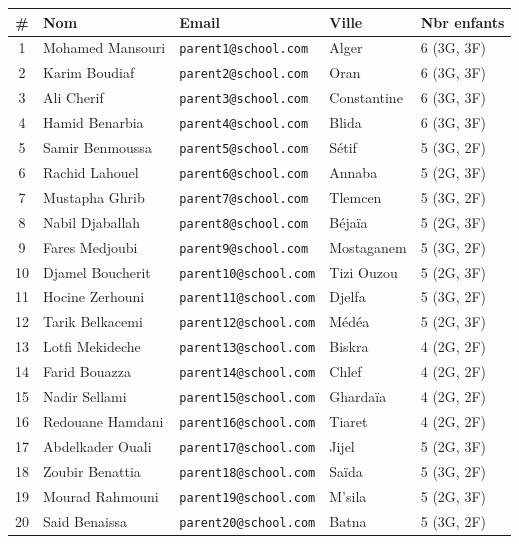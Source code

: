 \documentclass[a4paper,11pt]{article}
\begin{document}
\begin{longtable}{c l l l l}
    \toprule
    \textbf{\#} & \textbf{Nom}             & \textbf{Email}                   & \textbf{Ville}    & \textbf{Nbr enfants} \\
    \midrule
    \endhead
    1  & Mohamed Mansouri   & \texttt{parent1@school.com}  & Alger       & 6 (3G, 3F) \\
    2  & Karim Boudiaf      & \texttt{parent2@school.com}  & Oran        & 6 (3G, 3F) \\
    3  & Ali Cherif         & \texttt{parent3@school.com}  & Constantine & 6 (3G, 3F) \\
    4  & Hamid Benarbia     & \texttt{parent4@school.com}  & Blida       & 6 (3G, 3F) \\
    5  & Samir Benmoussa    & \texttt{parent5@school.com}  & Sétif       & 5 (3G, 2F) \\
    6  & Rachid Lahouel     & \texttt{parent6@school.com}  & Annaba      & 5 (2G, 3F) \\
    7  & Mustapha Ghrib     & \texttt{parent7@school.com}  & Tlemcen     & 5 (3G, 2F) \\
    8  & Nabil Djaballah    & \texttt{parent8@school.com}  & Béjaïa      & 5 (2G, 3F) \\
    9  & Fares Medjoubi     & \texttt{parent9@school.com}  & Mostaganem  & 5 (3G, 2F) \\
    10 & Djamel Boucherit   & \texttt{parent10@school.com} & Tizi Ouzou  & 5 (2G, 3F) \\
    11 & Hocine Zerhouni    & \texttt{parent11@school.com} & Djelfa      & 5 (3G, 2F) \\
    12 & Tarik Belkacemi    & \texttt{parent12@school.com} & Médéa       & 5 (2G, 3F) \\
    13 & Lotfi Mekideche    & \texttt{parent13@school.com} & Biskra      & 4 (2G, 2F) \\
    14 & Farid Bouazza      & \texttt{parent14@school.com} & Chlef       & 4 (2G, 2F) \\
    15 & Nadir Sellami      & \texttt{parent15@school.com} & Ghardaïa    & 4 (2G, 2F) \\
    16 & Redouane Hamdani   & \texttt{parent16@school.com} & Tiaret      & 4 (2G, 2F) \\
    17 & Abdelkader Ouali   & \texttt{parent17@school.com} & Jijel       & 5 (2G, 3F) \\
    18 & Zoubir Benattia    & \texttt{parent18@school.com} & Saïda       & 5 (3G, 2F) \\
    19 & Mourad Rahmouni    & \texttt{parent19@school.com} & M'sila      & 5 (2G, 3F) \\
    20 & Said Benaissa      & \texttt{parent20@school.com} & Batna       & 5 (3G, 2F) \\
    \bottomrule
\end{longtable}
\end{document}

